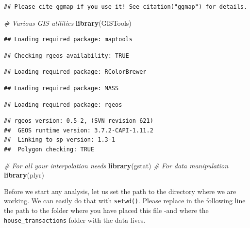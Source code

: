 \documentclass[]{book}
\newenvironment{Shaded}{\begin{snugshade}}{\end{snugshade}}
\newcommand{\KeywordTok}[1]{\textcolor[rgb]{0.13,0.29,0.53}{\textbf{#1}}}
\newcommand{\CommentTok}[1]{\textcolor[rgb]{0.56,0.35,0.01}{\textit{#1}}}
\newcommand{\NormalTok}[1]{#1}
\begin{document}
\begin{verbatim}
## Please cite ggmap if you use it! See citation("ggmap") for details.
\end{verbatim}

\begin{Shaded}
\begin{Highlighting}[]
\CommentTok{# Various GIS utilities}
\KeywordTok{library}\NormalTok{(GISTools)}
\end{Highlighting}
\end{Shaded}

\begin{verbatim}
## Loading required package: maptools
\end{verbatim}

\begin{verbatim}
## Checking rgeos availability: TRUE
\end{verbatim}

\begin{verbatim}
## Loading required package: RColorBrewer
\end{verbatim}

\begin{verbatim}
## Loading required package: MASS
\end{verbatim}

\begin{verbatim}
## Loading required package: rgeos
\end{verbatim}

\begin{verbatim}
## rgeos version: 0.5-2, (SVN revision 621)
##  GEOS runtime version: 3.7.2-CAPI-1.11.2 
##  Linking to sp version: 1.3-1 
##  Polygon checking: TRUE
\end{verbatim}

\begin{Shaded}
\begin{Highlighting}[]
\CommentTok{# For all your interpolation needs}
\KeywordTok{library}\NormalTok{(gstat)}
\CommentTok{# For data manipulation}
\KeywordTok{library}\NormalTok{(plyr)}
\end{Highlighting}
\end{Shaded}

Before we start any analysis, let us set the path to the directory where
we are working. We can easily do that with \texttt{setwd()}. Please
replace in the following line the path to the folder where you have
placed this file -and where the \texttt{house\_transactions} folder with
the data lives.
\end{document}

